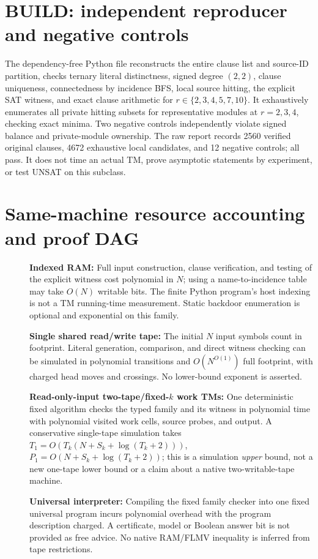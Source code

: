 \documentclass[11pt]{article}
\begin{document}
\section{BUILD: independent reproducer and negative controls}
The dependency-free Python file  reconstructs the entire clause list and source-ID partition, checks ternary literal distinctness, signed degree $(2,2)$, clause uniqueness, connectedness by incidence BFS, local source hitting, the explicit SAT witness, and exact clause arithmetic for $r\in\{2,3,4,5,7,10\}$. It exhaustively enumerates all private hitting subsets for representative modules at $r=2,3,4$, checking exact minima. Two negative controls independently violate signed balance and private-module ownership. The raw report records 2560 verified original clauses, 4672 exhaustive local candidates, and 12 negative controls; all pass. It does not time an actual TM, prove asymptotic statements by experiment, or test UNSAT on this subclass.

\section{Same-machine resource accounting and proof DAG}
\begin{description}
\item[] \textbf{Indexed RAM:} Full input construction, clause verification, and testing of the explicit witness cost polynomial in $N$; using a name-to-incidence table may take $O(N)$ writable bits. The finite Python program's host indexing is not a TM running-time measurement. Static backdoor enumeration is optional and exponential on this family.
\item[] \textbf{Single shared read/write tape:} The initial $N$ input symbols count in footprint. Literal generation, comparison, and direct witness checking can be simulated in polynomial transitions and $O(N^{O(1)})$ full footprint, with charged head moves and crossings. No lower-bound exponent is asserted.
\item[] \textbf{Read-only-input two-tape/fixed-$k$ work TMs:} One deterministic fixed algorithm checks the typed family and its witness in polynomial time with polynomial visited work cells, source probes, and output. A conservative single-tape simulation takes $T_1=O(T_k(N+S_k+\log(T_k+2)))$, $P_1=O(N+S_k+\log(T_k+2))$; this is a simulation \emph{upper} bound, not a new one-tape lower bound or a claim about a native two-writable-tape machine.
\item[] \textbf{Universal interpreter:} Compiling the fixed family checker into one fixed universal program incurs polynomial overhead with the program description charged. A certificate, model or Boolean answer bit is not provided as free advice. No native RAM/FLMV inequality is inferred from tape restrictions.
\end{description}
\end{document}
